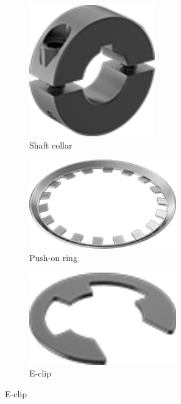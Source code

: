 	\begin{figure}[H]
		\centering
		\begin{subfigure}[b]{.24\linewidth}
			\includegraphics[width=0.6\textwidth]{imgs/shaftcollar.png}
			\caption{Shaft collar}
		\end{subfigure}
		\begin{subfigure}[b]{.24\linewidth}
			\includegraphics[width=0.7\textwidth]{imgs/pushonring.png}
			\caption{Push-on ring}
		\end{subfigure}
		\begin{subfigure}[b]{.24\linewidth}
			\includegraphics[width=0.7\textwidth]{imgs/eclip.png}
			\caption{E-clip}

\end{subfigure}
\end{figure}
